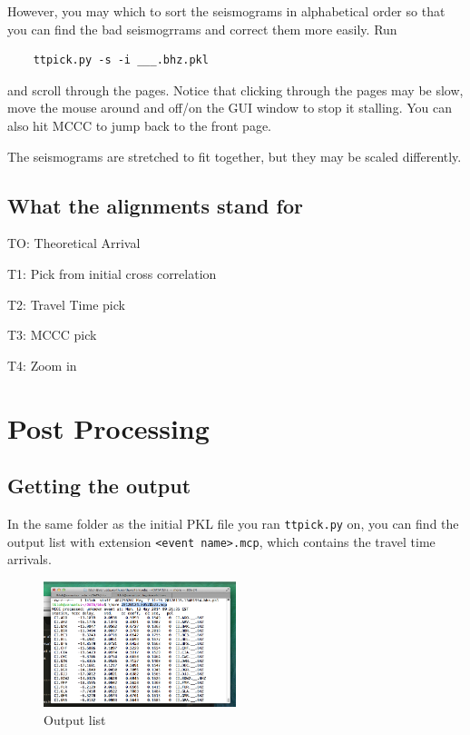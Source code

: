 \documentclass[letterpaper,10pt]{article}
\begin{document}
However, you may which to sort the seismograms in alphabetical order so that you can find the bad seismogrrams and correct them more easily. Run 

\begin{verbatim}
	ttpick.py -s -i ___.bhz.pkl
\end{verbatim}

and scroll through the pages. Notice that clicking through the pages may be slow, move the mouse around and off/on the GUI window to stop it stalling. You can also hit MCCC to jump back to the front page. 

The seismograms are stretched to fit together, but they may be scaled differently. 


\subsection{What the alignments stand for}

TO: Theoretical Arrival

T1: Pick from initial cross correlation

T2: Travel Time pick

T3: MCCC pick

T4: Zoom in


\section{Post Processing}

\subsection{Getting the output}

In the same folder as the initial PKL file you ran \texttt{ttpick.py} on, you can find the output list with extension \texttt{<event name>.mcp}, which contains the travel time arrivals. 

\begin{figure}[h!]
  \centering
  \includegraphics[width=0.5\textwidth]{images/output_list}
  \caption{Output list}
  \label{fig:output_list}
\end{figure}
\end{document}
